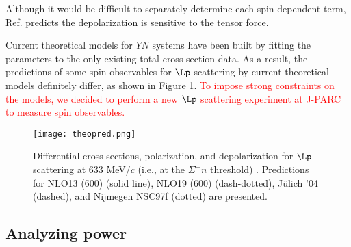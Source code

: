 Although it would be difficult to separately determine each spin-dependent term, Ref. \cite{chiEFT-1992} predicts the depolarization is sensitive to the tensor force. 

Current theoretical models for $YN$ systems have been built by fitting the parameters to the only existing total cross-section data. As a result, the predictions of some spin observables for $\Lp$ scattering by current theoretical models definitely differ, as shown in Figure \ref{fig-theopred}. \textcolor{red}{To impose strong constraints on the models, we decided to perform a new $\Lp$ scattering experiment at J-PARC to measure spin observables.}

\begin{figure}[h!]
 \begin{center}
   \texttt{[image: theopred.png]}
   \caption{Differential cross-sections, polarization, and depolarization for $\Lp$ scattering at 633 MeV/$c$ (i.e., at the $\Sigma^{+}n$ threshold) \cite{chiEFT-2021}. Predictions for NLO13 (600) (solid line), NLO19 (600) (dash-dotted), J\"{u}lich '04 (dashed), and Nijmegen NSC97f (dotted) are presented.}
   \label{fig-theopred}
 \end{center}
\end{figure}


\subsection{Analyzing power}
\label{sec-anapow}

